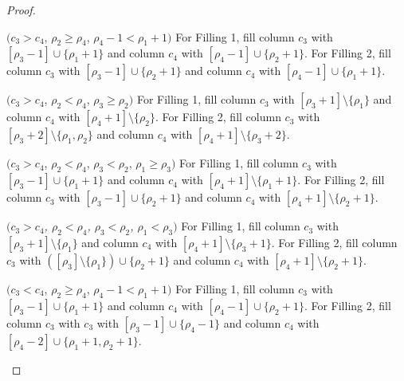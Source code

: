 \begin{proof}
\begin{Case}
{ $(c_3 > c_4$, $\rho_2\geq \rho_4$, $\rho_4-1< \rho_1+1)$} 
For Filling 1, fill column $c_3$ with $[\rho_3-1]\cup \{\rho_1+1\}$ and column $c_4$ with $[\rho_4-1]\cup \{\rho_2+1\}$. For Filling 2, fill column $c_3$ with $[\rho_3-1]\cup \{\rho_2+1\}$ and column $c_4$ with $[\rho_4-1]\cup \{\rho_1+1\}$.
\end{Case}

\begin{Case}
{ $(c_3> c_4$, $\rho_2< \rho_4$, $\rho_3\geq \rho_2)$} 
For Filling 1, fill column $c_3$ with $[\rho_3+1]\setminus\{\rho_1\}$ and column $c_4$ with $[\rho_4+1]\setminus \{\rho_2\}$. For Filling 2, fill column $c_3$ with $[\rho_3+2]\setminus \{\rho_1,\rho_2\}$ and column $c_4$ with $[\rho_4+1]\setminus \{\rho_3+2\}$.
\end{Case}

\begin{Case}
{ $(c_3 > c_4$, $\rho_2< \rho_4$, $\rho_3< \rho_2$, $\rho_1\geq \rho_3)$} 
For Filling 1, fill column $c_3$ with $[\rho_3 -1 ]\cup \{\rho_1+1\}$ and column $c_4$ with $[\rho_4+1]\setminus \{\rho_1+1\}$. For Filling 2, fill column $c_3$ with $[\rho_3 -1 ]\cup \{\rho_2+1\}$ and column $c_4$ with $[\rho_4+1]\setminus \{\rho_2+1\}$.
\end{Case}

\begin{Case}
\emph{ $(c_3 > c_4$, $\rho_2< \rho_4$, $\rho_3< \rho_2$, $\rho_1< \rho_3)$} 
For Filling 1, fill column $c_3$ with $[\rho_3+1]\setminus \{\rho_1\}$ and column $c_4$ with $[\rho_4+1]\setminus \{\rho_3+1\}$. For Filling 2, fill column $c_3$ with $([\rho_3]\setminus \{\rho_1\})\cup\{\rho_2+1\}$ and column $c_4$ with $[\rho_4+1]\setminus \{\rho_2+1\}$.
\end{Case}

\begin{Case}
{ $(c_3 < c_4$, $\rho_2\geq \rho_4$, $\rho_4-1 < \rho_1+1)$} 
For Filling 1, fill column $c_3$ with $[\rho_3-1]\cup \{\rho_1+1\}$ and column $c_4$ with $[\rho_4-1]\cup \{\rho_2+1\}$. For Filling 2, fill column $c_3$ with $c_3$ with $[\rho_3-1]\cup \{\rho_4-1\}$ and column $c_4$ with $[\rho_4-2]\cup \{\rho_1+1,\rho_2+1\}$.
\end{Case}


\end{proof}
